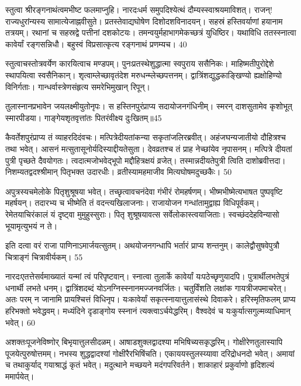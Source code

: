 स्तुत्वा श्रीरङ्गनाथंत्वमभीष्ट फलमाप्नुहि।
नारदःधर्म समुपदिश्येत्थं दौम्यस्स्वाश्रयमाविशत्।
राजन्! राज्यधुरांन्यस्य सामात्येजाह्नवीसुते।
प्रतस्तेवाद्यघोषेण दिशोदशविनादयन्।
सहस्रं हस्तिवर्याणां हयानाम तत्रयम्।
रथानां च सहस्रद्वे पत्तीनां दशकोटयः।
तमन्वयुर्महाभागमेकच्छत्रं युधिष्ठिर।
यथाविधि ततस्स्नात्वा कावेर्यां रङ्गसन्निधौ।
बहुस्वं विप्रसात्कृत्य रङ्गनाथं प्रणम्यच।
40

स्तुत्वाचस्तोत्रवर्येण कारयित्वाच मण्डपम्।
पुनःप्रतस्थेशुद्धात्मा स्वपुराय ससैनिकः।
माहिष्मतीपुरोद्देशे स्थापयित्वा स्वसैनिकान्।
शृत्वाम्लेच्छावृतंदेश मरुधन्म्लेच्छपत्तनम्।
द्वात्रिंशद्युद्धकाङ्खिण्यो ह्यक्षोहिण्यो विनिर्गताः।
गान्धर्वास्त्रेणसंहृत्य समरेभिमुखान् रिपून्।

तुलास्नानप्रभावेन जयलक्ष्मीयुतोनृपः।
स हस्तिनपुरंप्राप्य सदायोजनगंधिनीम्।
स्मरन् दाशसुतामेव कृशोभूत् स्मारपीडया।
गाङ्गेयशृतवृत्तांतः पितरंवीक्ष्य दुःखितम्॥45

कैवर्तेशपुरंप्राप्य तं व्याहरदिदंवचः।
मत्पित्रेदीयतांकन्या सकृतांजलिरब्रवीत्।
अहंजघन्यजातीयो दौहित्रश्च तथा भवेत्।
आसनं मत्सुतासूनोर्यदिस्याद्दीयतेसुता।
देवव्रतश्च तं प्राह नेच्छांयेव नृपासनम्।
मत्पित्रे दीयतां पुत्री पृच्छते दैवयोगतः।
त्वदात्मजोभवेद्भूपो मद्दौहित्रक्षयं व्रजेत्।
तस्मान्नदीयतेपुत्री त्विति दाशोब्रवीत्तदा।
निशम्यतद्वदश्श्रीमान् पितृभक्त उदारधीः।
व्रतीस्यामहमाजीव मित्यघोषमदुच्छकैः।
50

अपुत्रस्यचमेलोके पितृशुश्रूषया भवेत्।
तच्छृत्वावचनंदेवा गंभीरं रोमहर्षणम्।
भीष्मभीष्मेत्यभाषत पुष्पवृष्टि महर्षयन्।
तदारभ्य च भीष्मेति तं वदन्त्यखिलाजनाः।
राजायोजन गन्धांतामुद्वाह्य विधिपूर्वकम्।
रेमेतयाचिरंकालं यं दृष्ट्वा मुमुहुस्सुराः।
पितृ शुश्रूषयावत्स सर्वेलोकास्त्वयाजिताः।
स्वच्छंददेहविन्यासो भूयामृत्युभयं न ते।

इति दत्वा वरं राजा पाणिनाऽमार्जयत्सुतम्।
अथयोजनगन्धापि भर्तारं प्राप्य शन्तनुम्।
कालेद्वौसुषवेपुत्रौ चित्राङ्गं चित्रावीर्यकम्।
55

नारदःएतत्तेसर्वमाख्यातं यन्मां त्वं परिपृष्टवान्।
स्नात्वा तुलार्के कावेर्यां यःपठेच्छृणुयादपि।
पुत्रार्थीलभतेपुत्रं धनार्थी लभते धनम्।
द्वात्रिंशदब्दं योऽनग्निस्स्नानमज्जनवर्जितः।
चतुर्विंशति लक्षांक गायत्रीजपमाचरेत्।
अतः परम् न जानामि प्रायश्चित्तं विधिनृप।
यःकावेर्यां सकृत्स्नायात्तुलासंस्थे दिवाकरे।
हरिस्मृतिफलम् प्राप्य हरिभक्तो भवेद्धवम्।
मध्यंदिने दृडाङ्गोय स्स्नानं त्यक्त्वाऽर्चयेद्धरिम्।
वैश्वदेवं च यःकुर्यात्सगुल्मव्याधिमान् भवेत्।
60

अशक्तःपूजनेविष्णोर् बिभृयात्तुलसीदळम्।
आषाडशुक्लद्वादश्या मभिषिच्यसकृद्धरिम्।
गोक्षीरेणतुलास्यापि पूजयेत्पुरुषोत्तमम्।
नभस्य शुद्धद्वादश्यां गोक्षीरैरभिषिंचति।
एकाययस्तुलस्य्यावा दरिद्रोधनदो भवेत्।
अमायां च तथाकुर्याद् गयाश्राद्धं कृतं भवेत्।
मदुत्थाने मच्छयने मदंगपरिवर्तने।
शाकाहारं प्रकुर्वाणो हृदिशल्यं ममार्पयेत्।

